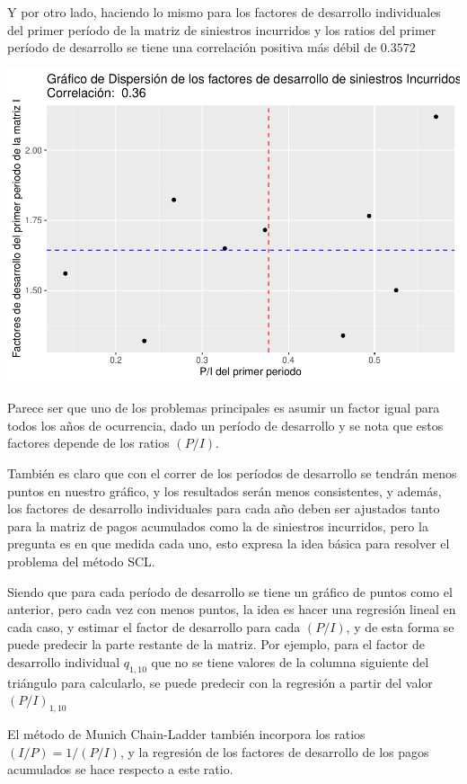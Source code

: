 \documentclass[
  12pt,
]{article}
\begin{document}
Y por otro lado, haciendo lo mismo para los factores de desarrollo
individuales del primer período de la matriz de siniestros incurridos y
los ratios del primer período de desarrollo se tiene una correlación
positiva más débil de \(0.3572\)

\includegraphics{informe_files/figure-latex/unnamed-chunk-26-1.pdf}

Parece ser que uno de los problemas principales es asumir un factor
igual para todos los años de ocurrencia, dado un período de desarrollo y
se nota que estos factores depende de los ratios \((P/I)\).

También es claro que con el correr de los períodos de desarrollo se
tendrán menos puntos en nuestro gráfico, y los resultados serán menos
consistentes, y además, los factores de desarrollo individuales para
cada año deben ser ajustados tanto para la matriz de pagos acumulados
como la de siniestros incurridos, pero la pregunta es en que medida cada
uno, esto expresa la idea básica para resolver el problema del método
SCL.

Siendo que para cada período de desarrollo se tiene un gráfico de puntos
como el anterior, pero cada vez con menos puntos, la idea es hacer una
regresión lineal en cada caso, y estimar el factor de desarrollo para
cada \((P/I)\), y de esta forma se puede predecir la parte restante de
la matriz. Por ejemplo, para el factor de desarrollo individual
\(q_{1,10}\) que no se tiene valores de la columna siguiente del
triángulo para calcularlo, se puede predecir con la regresión a partir
del valor \((P/I)_{1,10}\)

El método de Munich Chain-Ladder también incorpora los ratios
\((I/P)=1/(P/I)\), y la regresión de los factores de desarrollo de los
pagos acumulados se hace respecto a este ratio.
\end{document}
